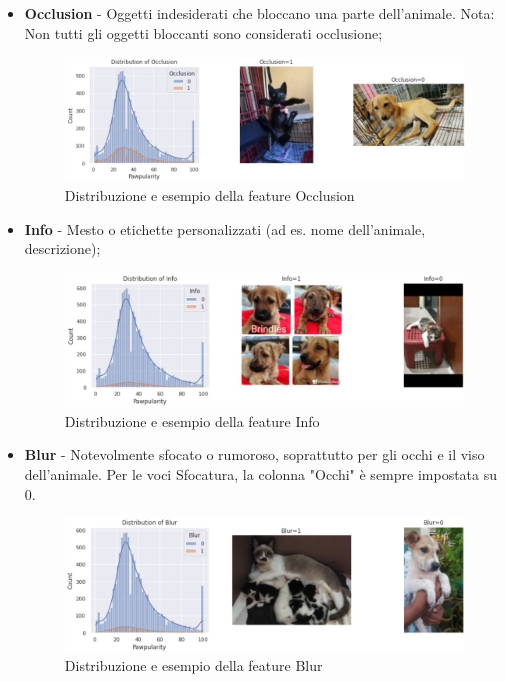 \begin{itemize}
\begin{figure}[H]
            \label{fig:human}
        \end{figure}
        \item \textbf{Occlusion} - Oggetti indesiderati che bloccano una parte dell'animale. Nota: Non tutti gli oggetti bloccanti sono considerati occlusione;
        \begin{figure}[H]
            \centering
            \includegraphics[scale=0.5]{Plot/distribution_occlusion.jpg}
            \caption{Distribuzione e esempio della feature Occlusion}
            \label{fig:occlusion}
        \end{figure}
        \item \textbf{Info} - Mesto o etichette personalizzati (ad es. nome dell'animale, descrizione);
        \begin{figure}[H]
            \centering
            \includegraphics[scale=0.5]{Plot/distribution_info.jpg}
            \caption{Distribuzione e esempio della feature Info}
            \label{fig:info}
        \end{figure}
        \item \textbf{Blur} - Notevolmente sfocato o rumoroso, soprattutto per gli occhi e il viso dell'animale. Per le voci Sfocatura, la colonna "Occhi" è sempre impostata su 0.
        \begin{figure}[H]
            \centering
            \includegraphics[scale=0.5]{Plot/distribution_blur.jpg}
            \caption{Distribuzione e esempio della feature Blur}
            \label{fig:blur}
        \end{figure}
    \end{itemize}
    
